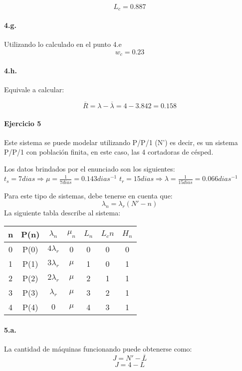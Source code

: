 \documentclass{article}
\begin{document}
    $$ L_c = 0.887$$
    
    \paragraph{4.g.} Utilizando lo calculado en el punto 4.e
    $$ w_c = 0.23 $$
    \paragraph{4.h.} Equivale a calcular:

    $$\overline{R} = \lambda - \overline{\lambda} = 4 - 3.842 = 0.158$$

\paragraph{Ejercicio 5}
  Este sistema se puede modelar utilizando P/P/1 (N') es decir, es un sistema P/P/1 con poblaci\'on finita, en este caso, las 4 cortadoras de c\'esped.
  
  Los datos brindados por el enunciado son los siguientes: $t_s = 7 dias\Rightarrow \mu = \frac{1}{7dias} = 0.143dias^{-1} $  $t_r = 15 dias\Rightarrow\lambda = \frac{1}{15dias} = 0.066dias^{-1}$
  
  Para este tipo de sistemas, debe tenerse en cuenta que:
  $$\lambda_n = \lambda_r (N' - n)$$
    La siguiente tabla describe al sistema:
    \begin{center}
    \begin{tabular}{|| c | c | c | c | c | c | c ||}
    \hline 
     n & P(n) & $\lambda_n$ & $\mu_n$ & $L_n$& $L_cn$ & $H_n$  \\ \hline \hline
     0 & P(0) & $4\lambda_r$   & 0       & 0    & 0      & 0  \\ \hline
     1 & P(1) & $3\lambda_r$   & $\mu$   & 1    & 0      & 1  \\ \hline
     2 & P(2) & $2\lambda_r$   & $\mu$  & 2    & 1      & 1    	\\ \hline
     3 & P(3) & $\lambda_r$ & $\mu$  & 3    & 2      & 1   \\ \hline
     4 & P(4) & $0$       & $\mu$  & 4    & 3      & 1       \\ \hline  
    \end{tabular}
    \end{center}
  
\paragraph{5.a.} La cantidad de m\'aquinas funcionando puede obtenerse como:
  $$J = N' - \overline{L}$$
  $$J = 4 - \overline{L} $$
\end{document}
